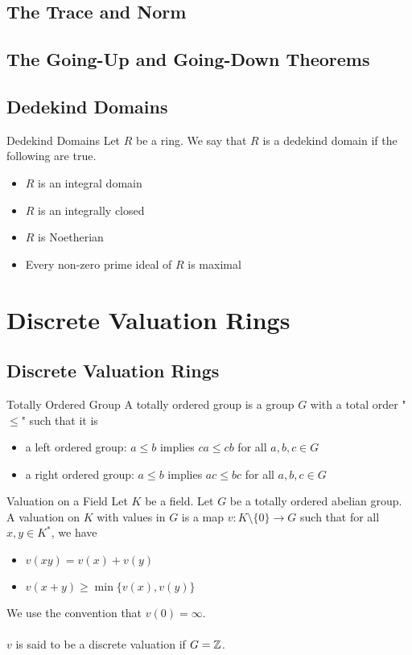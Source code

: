 \documentclass[a4paper]{article}
\begin{document}
\subsection{The Trace and Norm}

\subsection{The Going-Up and Going-Down Theorems}

\subsection{Dedekind Domains}
\begin{defn}{Dedekind Domains}{} Let $R$ be a ring. We say that $R$ is a dedekind domain if the following are true. 
\begin{itemize}
\item $R$ is an integral domain
\item $R$ is an integrally closed
\item $R$ is Noetherian
\item Every non-zero prime ideal of $R$ is maximal
\end{itemize}
\end{defn}


\pagebreak
\section{Discrete Valuation Rings}
\subsection{Discrete Valuation Rings}
\begin{defn}{Totally Ordered Group}{} A totally ordered group is a group $G$ with a total order "$\leq$" such that it is
\begin{itemize}
\item a left ordered group: $a\leq b$ implies $ca\leq cb$ for all $a,b,c\in G$
\item a right ordered group: $a\leq b$ implies $ac\leq bc$ for all $a,b,c\in G$
\end{itemize}
\end{defn}

\begin{defn}{Valuation on a Field}{} Let $K$ be a field. Let $G$ be a totally ordered abelian group. A valuation on $K$ with values in $G$ is a map $v:K\setminus\{0\}\to G$ such that for all $x,y\in K^\ast$, we have 
\begin{itemize}
\item $v(xy)=v(x)+v(y)$
\item $v(x+y)\geq\min\{v(x),v(y)\}$
\end{itemize}
We use the convention that $v(0)=\infty$. \\~\\
$v$ is said to be a discrete valuation if $G=\mathbb{Z}$. 
\end{defn}
\end{document}
